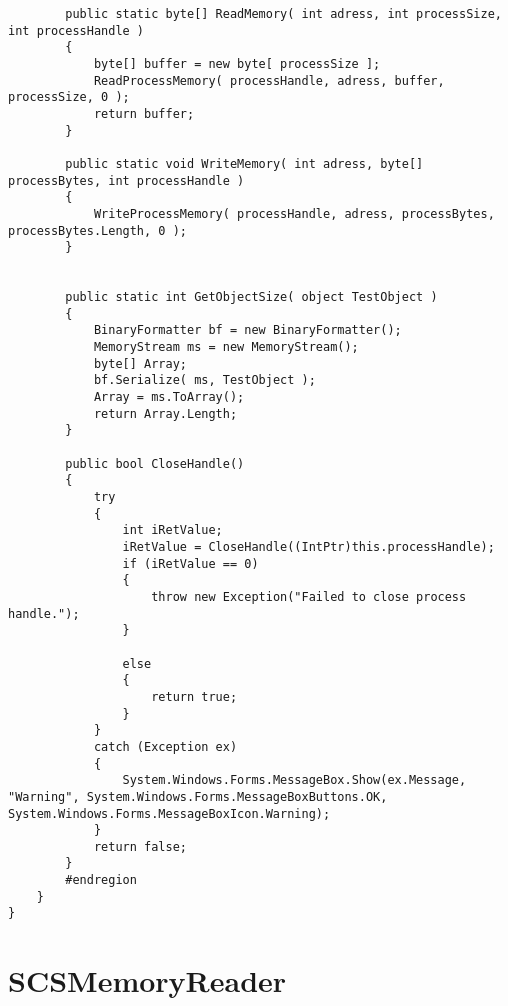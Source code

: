 \begin{lstlisting}
        public static byte[] ReadMemory( int adress, int processSize, int processHandle )
        {
            byte[] buffer = new byte[ processSize ];
            ReadProcessMemory( processHandle, adress, buffer, processSize, 0 );
            return buffer;
        }

        public static void WriteMemory( int adress, byte[] processBytes, int processHandle )
        {
            WriteProcessMemory( processHandle, adress, processBytes, processBytes.Length, 0 );
        }


        public static int GetObjectSize( object TestObject )
        {
            BinaryFormatter bf = new BinaryFormatter();
            MemoryStream ms = new MemoryStream();
            byte[] Array;
            bf.Serialize( ms, TestObject );
            Array = ms.ToArray();
            return Array.Length;
        }

        public bool CloseHandle()
        {
            try
            {
                int iRetValue;
                iRetValue = CloseHandle((IntPtr)this.processHandle);
                if (iRetValue == 0)
                {
                    throw new Exception("Failed to close process handle.");
                }

                else
                {
                    return true;
                }
            }
            catch (Exception ex)
            {
                System.Windows.Forms.MessageBox.Show(ex.Message, "Warning", System.Windows.Forms.MessageBoxButtons.OK, System.Windows.Forms.MessageBoxIcon.Warning);
            }
            return false;
        }
        #endregion
    }
}
\end{lstlisting}

\section{SCSMemoryReader}

